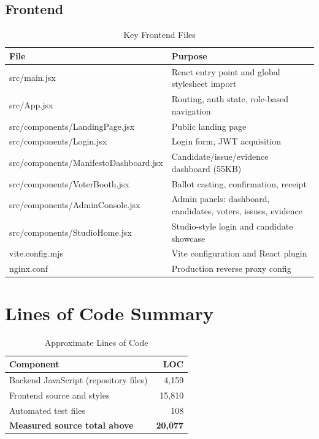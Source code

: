 \subsection{Frontend}
\begin{table}[H]
\centering
\caption{Key Frontend Files}
\label{tab:frontend-files}
\begin{tabular}{@{}ll@{}}
\toprule
\textbf{File} & \textbf{Purpose} \\
\midrule
src/main.jsx & React entry point and global stylesheet import \\
src/App.jsx & Routing, auth state, role-based navigation \\
src/components/LandingPage.jsx & Public landing page \\
src/components/Login.jsx & Login form, JWT acquisition \\
src/components/ManifestoDashboard.jsx & Candidate/issue/evidence dashboard (55KB) \\
src/components/VoterBooth.jsx & Ballot casting, confirmation, receipt \\
src/components/AdminConsole.jsx & Admin panels: dashboard, candidates, voters, issues, evidence \\
src/components/StudioHome.jsx & Studio-style login and candidate showcase \\
vite.config.mjs & Vite configuration and React plugin \\
nginx.conf & Production reverse proxy config \\
\midrule
\end{tabular}
\end{table}

\section{Lines of Code Summary}
\label{sec:loc}

\begin{table}[H]
\centering
\caption{Approximate Lines of Code}
\label{tab:loc}
\begin{tabular}{@{}lr@{}}
\toprule
\textbf{Component} & \textbf{LOC} \\
\midrule
Backend JavaScript (repository files) & 4,159 \\
Frontend source and styles & 15,810 \\
Automated test files & 108 \\
\midrule
\textbf{Measured source total above} & \textbf{20,077} \\
\bottomrule
\end{tabular}
\end{table}
